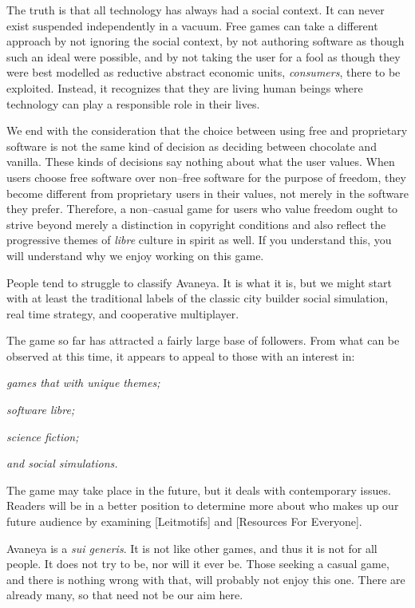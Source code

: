 The truth is that all technology has always had a social context. It can never exist suspended independently in a vacuum. Free games can take a different approach by not ignoring the social context, by not authoring software as though such an ideal were possible, and by not taking the user for a fool as though they were best modelled as reductive abstract economic units, {\it consumers}, there to be exploited. Instead, it recognizes that they are living human beings where technology can play a responsible role in their lives. 

We end with the consideration that the choice between using free and proprietary software is not the same kind of decision as deciding between chocolate and vanilla. These kinds of decisions say nothing about what the user values. When users choose free software over non--free software for the purpose of freedom, they become different from proprietary users in their values, not merely in the software they prefer. Therefore, a non--casual game for users who value freedom ought to strive beyond merely a distinction in copyright conditions and also reflect the progressive themes of {\it libre} culture in spirit as well. If you understand this, you will understand why we enjoy working on this game.

People tend to struggle to classify Avaneya. It is what it is, but we might start with at least the traditional labels of the classic city builder social simulation, real time strategy, and cooperative multiplayer.

The game so far has attracted a fairly large base of followers. From what can be observed at this time, it appears to appeal to those with an interest in:

\startitemize[4]
\item
{\it games that with unique themes;}
\item
{\it software libre;}
\item
{\it science fiction;}
\item
{\it and social simulations.}
\stopitemize

The game may take place in the future, but it deals with contemporary issues. Readers will be in a better position to determine more about who makes up our future audience by examining [Leitmotifs] and [Resources For Everyone].

Avaneya is a {\it sui generis}. It is not like other games, and thus it is not for all people. It does not try to be, nor will it ever be. Those seeking a casual game, and there is nothing wrong with that, will probably not enjoy this one. There are already many, so that need not be our aim here.

